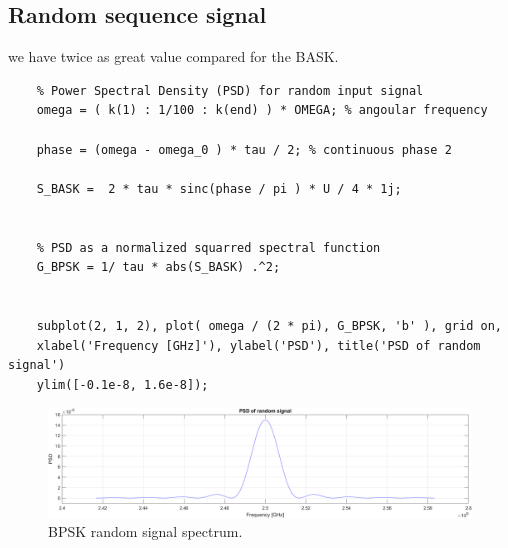 \subsection{Random sequence signal}

we have twice as great value compared for the BASK.


\begin{lstlisting}
    % Power Spectral Density (PSD) for random input signal
    omega = ( k(1) : 1/100 : k(end) ) * OMEGA; % angoular frequency 

    phase = (omega - omega_0 ) * tau / 2; % continuous phase 2

    S_BASK =  2 * tau * sinc(phase / pi ) * U / 4 * 1j;


    % PSD as a normalized squarred spectral function
    G_BPSK = 1/ tau * abs(S_BASK) .^2;


    subplot(2, 1, 2), plot( omega / (2 * pi), G_BPSK, 'b' ), grid on,
    xlabel('Frequency [GHz]'), ylabel('PSD'), title('PSD of random signal')
    ylim([-0.1e-8, 1.6e-8]);
\end{lstlisting}


\begin{figure}[h]
    \centering
    \includegraphics[width = \textwidth]{../res/imgs/random-signal-spectrum.png}
    \caption{BPSK random signal spectrum.}
    \label{fig:random-signal-spectrum}
\end{figure}